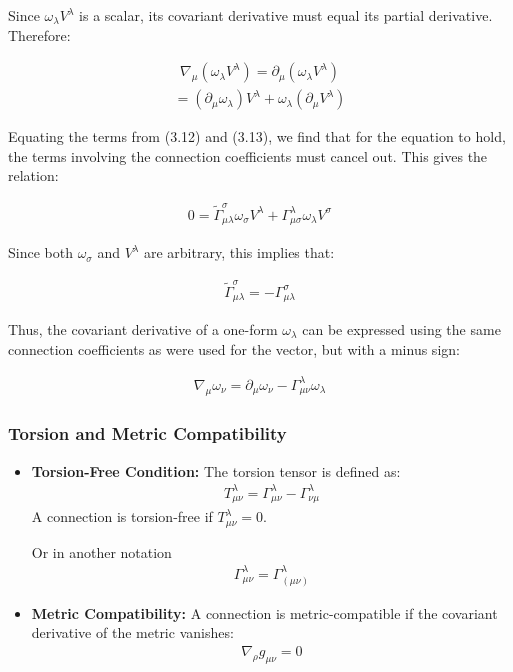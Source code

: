 \documentclass[12pt]{book}
\begin{document}
Since \( \omega_\lambda V^\lambda \) is a scalar, its covariant derivative must equal its partial derivative. Therefore:

\begin{align}
\nabla_\mu (\omega_\lambda V^\lambda) = \partial_\mu (\omega_\lambda V^\lambda)
\end{align}
\begin{align}
= (\partial_\mu \omega_\lambda) V^\lambda + \omega_\lambda (\partial_\mu V^\lambda)
\end{align}

Equating the terms from (3.12) and (3.13), we find that for the equation to hold, the terms involving the connection coefficients must cancel out. This gives the relation:

\begin{align}
0 = \tilde{\Gamma}^\sigma_{\mu\lambda} \omega_\sigma V^\lambda + \Gamma^\lambda_{\mu\sigma} \omega_\lambda V^\sigma
\end{align}

Since both \( \omega_\sigma \) and \( V^\lambda \) are arbitrary, this implies that:

\begin{align}
\tilde{\Gamma}^\sigma_{\mu\lambda} = -\Gamma^\sigma_{\mu\lambda}
\end{align}

Thus, the covariant derivative of a one-form \( \omega_\lambda \) can be expressed using the same connection coefficients as were used for the vector, but with a minus sign:

\begin{align}
\nabla_\mu \omega_\nu = \partial_\mu \omega_\nu - \Gamma^\lambda_{\mu\nu} \omega_\lambda
\end{align}

\subsubsection{Torsion and Metric Compatibility}
\begin{itemize}
  \item \textbf{Torsion-Free Condition:} The torsion tensor is defined as:
  \begin{align}
  T^\lambda_{\mu\nu} = \Gamma^\lambda_{\mu\nu} - \Gamma^\lambda_{\nu\mu}
  \end{align}
  A connection is torsion-free if \(T^\lambda_{\mu\nu} = 0\).

  Or in another notation
  \begin{align}
  \Gamma^{\lambda}_{\mu\nu} = \Gamma^{\lambda}_{(\mu\nu)}
  \end{align}
  \item \textbf{Metric Compatibility:} A connection is metric-compatible if the covariant derivative of the metric vanishes:
  \begin{align}
  \nabla_\rho g_{\mu\nu} = 0
  \end{align}
\end{itemize}
\end{document}
